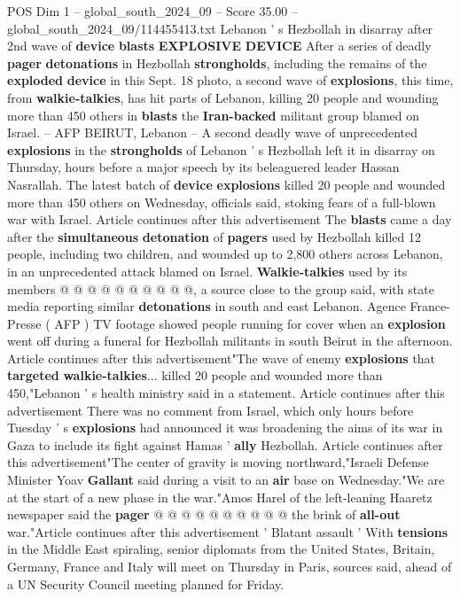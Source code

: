 \begin{textsample}{POS Dim 1 – global\_south\_2024\_09 – Score 35.00 – global\_south\_2024\_09/114455413.txt}  \label{ex:f1_pos_031}
Lebanon ' s Hezbollah in disarray after 2nd wave of \textbf{device} \textbf{blasts} \textbf{EXPLOSIVE} \textbf{DEVICE} After a series of deadly \textbf{pager} \textbf{detonations} in Hezbollah \textbf{strongholds}, including the remains of the \textbf{exploded} \textbf{device} in this Sept. 18 photo, a second wave of \textbf{explosions}, this time, from \textbf{walkie-talkies}, has hit parts of Lebanon, killing 20 people and wounding more than 450 others in \textbf{blasts} the \textbf{Iran-backed} militant group blamed on Israel. -- AFP BEIRUT, Lebanon -- A second deadly wave of unprecedented \textbf{explosions} in the \textbf{strongholds} of Lebanon ' s Hezbollah left it in disarray on Thursday, hours before a major speech by its beleaguered leader Hassan Nasrallah.
The latest batch of \textbf{device} \textbf{explosions} killed 20 people and wounded more than 450 others on Wednesday, officials said, stoking fears of a full-blown war with Israel.
Article continues after this advertisement The \textbf{blasts} came a day after the \textbf{simultaneous} \textbf{detonation} of \textbf{pagers} used by Hezbollah killed 12 people, including two children, and wounded up to 2,800 others across Lebanon, in an unprecedented attack blamed on Israel. \textbf{Walkie-talkies} used by its members @ @ @ @ @ @ @ @ @ @, a source close to the group said, with state media reporting similar \textbf{detonations} in south and east Lebanon.
Agence France-Presse ( AFP ) TV footage showed people running for cover when an \textbf{explosion} went off during a funeral for Hezbollah militants in south Beirut in the afternoon.
Article continues after this advertisement"The wave of enemy \textbf{explosions} that \textbf{targeted} \textbf{walkie-talkies}... killed 20 people and wounded more than 450,"Lebanon ' s health ministry said in a statement.
Article continues after this advertisement There was no comment from Israel, which only hours before Tuesday ' s \textbf{explosions} had announced it was broadening the aims of its war in Gaza to include its fight against Hamas ' \textbf{ally} Hezbollah.
Article continues after this advertisement"The center of gravity is moving northward,"Israeli Defense Minister Yoav \textbf{Gallant} said during a visit to an \textbf{air} base on Wednesday."We are at the start of a new phase in the war."Amos Harel of the left-leaning Haaretz newspaper said the \textbf{pager} @ @ @ @ @ @ @ @ @ @ the brink of \textbf{all-out} war."Article continues after this advertisement ' Blatant assault ' With \textbf{tensions} in the Middle East spiraling, senior diplomats from the United States, Britain, Germany, France and Italy will meet on Thursday in Paris, sources said, ahead of a UN Security Council meeting planned for Friday.

\end{textsample}
